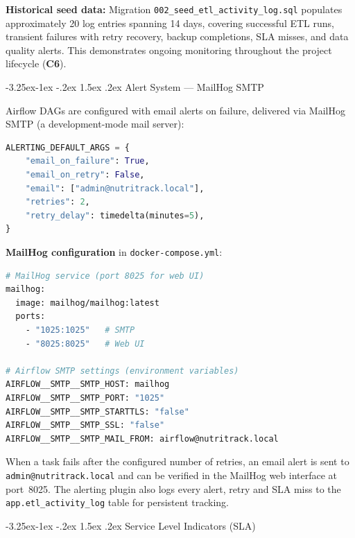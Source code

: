 \documentclass[a4paper,11pt,oneside,openany]{report}
\makeatletter
\renewcommand\subsection{\@startsection{subsection}{2}{\z@}%
  {-3.25ex\@plus -1ex \@minus -.2ex}%
  {1.5ex \@plus .2ex}%
  {\normalfont\large\bfseries\color{ntdarkgreen}}}
\newcommand{\competence}[1]{\textbf{\textcolor{ntgreen}{#1}}}
\makeatother
\begin{document}
\textbf{Historical seed data:} Migration \texttt{002\_seed\_etl\_activity\_log.sql}
populates approximately 20 log entries spanning 14 days, covering
successful ETL runs, transient failures with retry recovery, backup
completions, SLA misses, and data quality alerts. This demonstrates
ongoing monitoring throughout the project lifecycle (\competence{C6}).

\subsection{Alert System --- MailHog SMTP}

Airflow DAGs are configured with email alerts on failure, delivered via
MailHog SMTP (a development-mode mail server):

\begin{lstlisting}[language=Python, caption={Alerting default configuration (airflow/plugins/alerting.py)}]
ALERTING_DEFAULT_ARGS = {
    "email_on_failure": True,
    "email_on_retry": False,
    "email": ["admin@nutritrack.local"],
    "retries": 2,
    "retry_delay": timedelta(minutes=5),
}
\end{lstlisting}

\textbf{MailHog configuration} in \texttt{docker-compose.yml}:

\begin{lstlisting}[language=bash, caption={MailHog service and Airflow SMTP configuration}]
# MailHog service (port 8025 for web UI)
mailhog:
  image: mailhog/mailhog:latest
  ports:
    - "1025:1025"   # SMTP
    - "8025:8025"   # Web UI

# Airflow SMTP settings (environment variables)
AIRFLOW__SMTP__SMTP_HOST: mailhog
AIRFLOW__SMTP__SMTP_PORT: "1025"
AIRFLOW__SMTP__SMTP_STARTTLS: "false"
AIRFLOW__SMTP__SMTP_SSL: "false"
AIRFLOW__SMTP__SMTP_MAIL_FROM: airflow@nutritrack.local
\end{lstlisting}

When a task fails after the configured number of retries, an email alert
is sent to \texttt{admin@nutritrack.local} and can be verified in the
MailHog web interface at port~8025. The alerting plugin also logs every
alert, retry and SLA miss to the \texttt{app.etl\_activity\_log} table
for persistent tracking.

\subsection{Service Level Indicators (SLA)}
\end{document}
